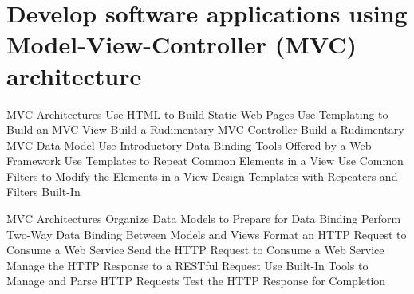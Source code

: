 \section {Develop software applications using Model-View-Controller (MVC) architecture  }
\begin{frame}{MVC Architectures}
	Use HTML to Build Static Web Pages
	Use Templating to Build an MVC View
	Build a Rudimentary MVC Controller
	Build a Rudimentary MVC Data Model
	Use Introductory Data-Binding Tools Offered by a Web Framework
	Use Templates to Repeat Common Elements in a View
	Use Common Filters to Modify the Elements in a View
	Design Templates with Repeaters and Filters Built-In
\end{frame}	

\begin{frame}{MVC Architectures}
	Organize Data Models to Prepare for Data Binding
	Perform Two-Way Data Binding Between Models and Views
	Format an HTTP Request to Consume a Web Service
	Send the HTTP Request to Consume a Web Service
	Manage the HTTP Response to a RESTful Request
	Use Built-In Tools to Manage and Parse HTTP Requests
	Test the HTTP Response for Completion      
\end{frame}	